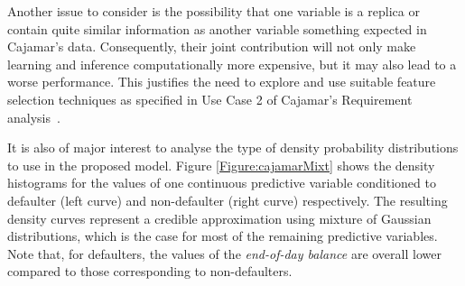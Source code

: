 %

%



Another issue to consider is the possibility that one variable is a replica or contain quite similar information as another variable something expected in Cajamar's data. Consequently, their joint contribution will not only make learning and inference computationally more expensive, but it may also lead to a worse performance. This justifies the need to explore and use suitable feature selection techniques as specified in Use Case 2 of Cajamar's Requirement analysis~\cite{Fer14b}.

It is also of major interest to analyse the type of density probability distributions to use in the proposed model. Figure \ref{Figure:cajamarMixt} shows the density histograms for the values of one continuous predictive variable conditioned to defaulter (left curve) and non-defaulter (right curve) respectively. The resulting density curves represent a credible approximation using mixture of Gaussian distributions, which is the case for most of the remaining predictive variables. Note that, for defaulters, the values of the \emph{end-of-day balance} are overall lower compared to those corresponding to non-defaulters.

